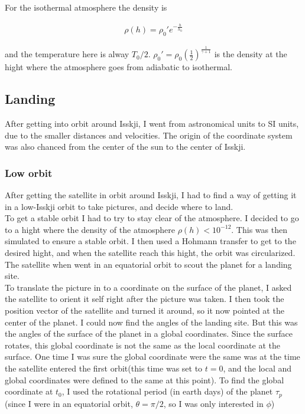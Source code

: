 \documentclass[a4paper, 10pt]{article}
\begin{document}
For the isothermal atmosphere the density is

\begin{align}
\rho (h) = \rho_0'e^{-\frac{h}{h_0}}
\end{align}

and the temperature here is alway $T_0/2$. $\rho_0' = \rho_0 \left( \frac{1}{2} \right) ^{\frac{1}{\gamma + 1}}$ is the density at the hight where the atmosphere goes from adiabatic to isothermal.


\subsection{Landing}
After getting into orbit around Isskji, I went from astronomical units to SI units, due to the smaller distances and velocities. The origin of the coordinate system was also chanced from the center of the sun to the center of Isskji.

\subsubsection{Low orbit}
After getting the satellite in orbit around Isskji, I had to find a way of getting it in a low-Isskji orbit to take pictures, and decide where to land.\\

To get a stable orbit I had to try to stay clear of the atmosphere. I decided to go to a hight where the density of the atmosphere $\rho (h) < 10^{-12}$. This was then simulated to ensure a stable orbit. I then used a Hohmann transfer to get to the desired hight, and when the satellite reach this hight, the orbit was circularized. The satellite when went in an equatorial orbit to scout the planet for a landing site.\\

To translate the picture in to a coordinate on the surface of the planet, I asked the satellite to orient it self right after the picture was taken. I then took the position vector of the satellite and turned it around, so it now pointed at the center of the planet. I could now find the angles of the landing site. But this was the angles of the surface of the planet in a global coordinates. Since the surface rotates, this global coordinate is not the same as the local coordinate at the surface. One time I was sure the global coordinate were the same was at the time the satellite entered the first orbit(this time was set to $t = 0$, and the local and global coordinates were defined to the same at this point). To find the global coordinate at $t_0$, I used the rotational period (in earth days) of the planet $\tau_p$ (since I were in an equatorial orbit, $\theta = \pi /2$, so I was only interested in $\phi$)
\end{document}

